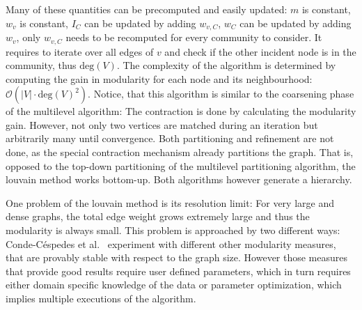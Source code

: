                 Many of these quantities can be precomputed and easily updated:
                $m$ is constant, $w_v$ is constant, $I_C$ can be updated by adding $w_{v, C}$, $w_C$ can be updated by adding $w_v$, only $w_{v, C}$ needs to be recomputed for every community to consider. 
                It requires to iterate over all edges of $v$ and check if the other incident node is in the community, thus $\text{deg}(V)$.
                The complexity of the algorithm is determined by computing the gain in modularity for each node and its neighbourhood: 
                $\mathcal{O}(|V| \cdot \text{deg}(V)^2)$.
                Notice, that this algorithm is similar to the coarsening phase of the multilevel algorithm: 
                The contraction is done by calculating the modularity gain.
                However, not only two vertices are matched during an iteration but arbitrarily many until convergence. 
                Both partitioning and refinement are not done, as the special contraction mechanism already partitions the graph.
                That is, opposed to the top-down partitioning of the multilevel partitioning algorithm, the louvain method works bottom-up.
                Both algorithms however generate a hierarchy.
                
                One problem of the louvain method is its resolution limit:
                For very large and dense graphs, the total edge weight grows extremely large and thus the modularity is always small.
                This problem is approached by two different ways:
                Conde-C{\'e}spedes et al.~\autocite{conde2017comparison} experiment with different other modularity measures, that are provably stable with respect to the graph size.
                However those measures that provide good results require user defined parameters, which in turn requires either domain specific knowledge of the data or parameter optimization, which implies multiple executions of the algorithm. 
                
